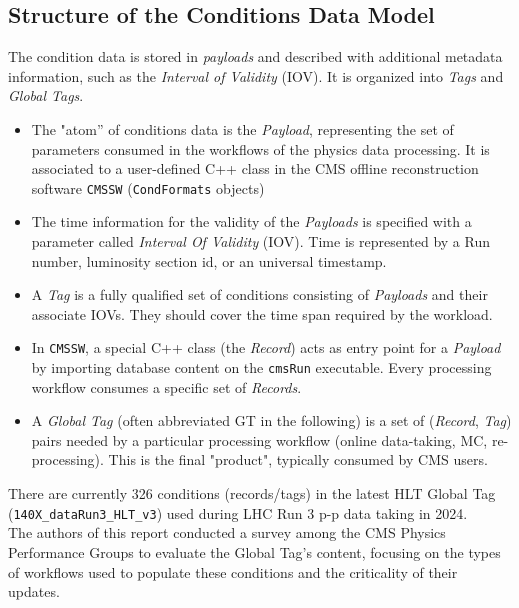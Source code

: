 \subsection{Structure of the Conditions Data Model}
The condition data is stored in \emph{payloads} and described with additional metadata information, such as the \emph{Interval of
Validity} (IOV). It is organized into \emph{Tags} and \emph{Global Tags}.
\begin{itemize}
\item The "atom” of conditions data is the \emph{Payload}, representing the set of parameters consumed in the workflows of the physics data processing. It is associated to a user-defined C++ class in the CMS offline reconstruction software \texttt{CMSSW} (\texttt{CondFormats} objects)
\item The time information for the validity of the \emph{Payloads} is specified with a parameter called \emph{Interval Of Validity} (IOV). Time is represented by a Run number, luminosity section id, or an universal timestamp.
\item A \emph{Tag} is a fully qualified set of conditions consisting of
\emph{Payloads} and their associate IOVs. They should cover the time span required by the workload. 
\item In \texttt{CMSSW}, a special C++ class (the \emph{Record}) acts as entry point for a \emph{Payload} by importing database content on the \texttt{cmsRun} executable. Every processing workflow consumes a specific set of \emph{Records}.
\item A \emph{Global Tag} (often abbreviated GT in the following) is a set of (\emph{Record}, \emph{Tag}) pairs needed by a particular processing workflow (online data-taking, MC, re-processing). This is the final "product", typically consumed by CMS users.
\end{itemize}

There are currently 326 conditions (records/tags) in the latest HLT Global Tag (\texttt{140X\_dataRun3\_HLT\_v3}) used during LHC Run 3 p-p data taking in 2024.\\
 The authors of this report conducted a survey among the CMS Physics Performance Groups to evaluate the Global Tag's content, focusing on the types of workflows used to populate these conditions and the criticality of their updates.


